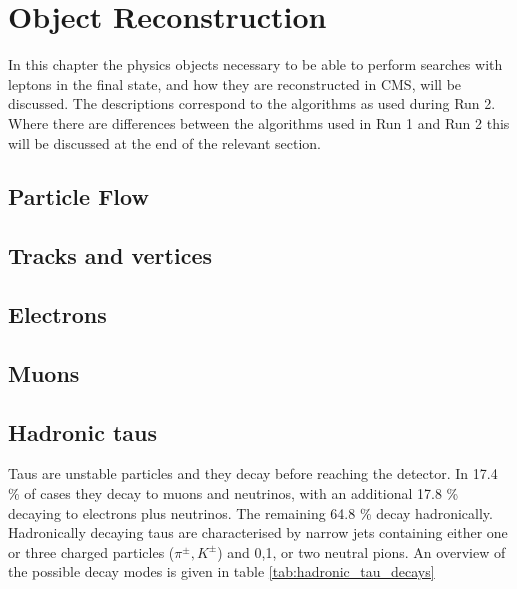 \chapter{Object Reconstruction}
\label{chap:objects}

In this chapter the physics objects necessary to be able to perform searches with \Pgt leptons
in the final state, and how they are reconstructed in \ac{CMS}, will be discussed. The 
descriptions correspond to the algorithms as used during Run 2. Where there are differences
between the algorithms used in Run 1 and Run 2 this will be discussed at the end
of the relevant section.

\section{Particle Flow}
\label{sec:objects_pf}

\section{Tracks and vertices}
\label{sec:objects_pv}

\section{Electrons}
\label{sec:objects_ele}

\section{Muons}
\label{sec:objects_muo}

\section{Hadronic taus}
\label{sec:objects_tau}
Taus are unstable particles and they decay before reaching the detector. In 17.4 \% of 
cases they decay to muons and neutrinos, with an additional 17.8 \% decaying to electrons
plus neutrinos. The remaining 64.8 \% decay hadronically. Hadronically decaying
taus are characterised by narrow jets containing either one or three charged
particles ($\pi^{\pm}, K^{\pm}$) and 0,1, or two neutral pions. An overview
of the possible decay modes is given in table \ref{tab:hadronic_tau_decays}

